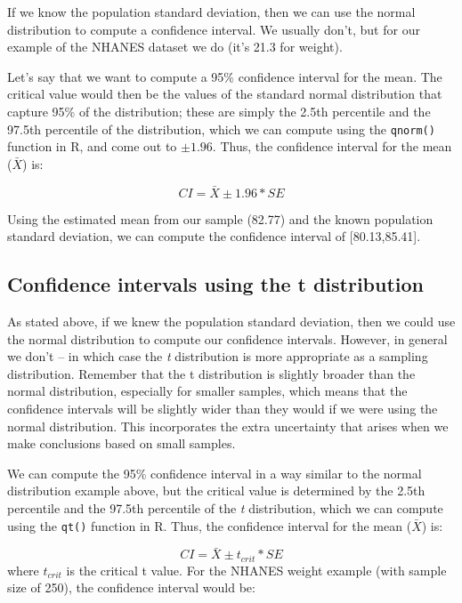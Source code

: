 \documentclass[]{book}
\theoremstyle{definition}
\theoremstyle{definition}
\theoremstyle{definition}
\theoremstyle{remark}
\begin{document}
If we know the population standard deviation, then we can use the normal
distribution to compute a confidence interval. We usually don't, but for
our example of the NHANES dataset we do (it's 21.3 for weight).

Let's say that we want to compute a 95\% confidence interval for the
mean. The critical value would then be the values of the standard normal
distribution that capture 95\% of the distribution; these are simply the
2.5th percentile and the 97.5th percentile of the distribution, which we
can compute using the \texttt{qnorm()} function in R, and come out to
\(\pm 1.96\). Thus, the confidence interval for the mean (\(\bar{X}\))
is:

\[
CI = \bar{X} \pm 1.96*SE
\]

Using the estimated mean from our sample (82.77) and the known
population standard deviation, we can compute the confidence interval of
{[}80.13,85.41{]}.

\subsection{Confidence intervals using the t
distribution}\label{confidence-intervals-using-the-t-distribution}

As stated above, if we knew the population standard deviation, then we
could use the normal distribution to compute our confidence intervals.
However, in general we don't -- in which case the \emph{t} distribution
is more appropriate as a sampling distribution. Remember that the t
distribution is slightly broader than the normal distribution,
especially for smaller samples, which means that the confidence
intervals will be slightly wider than they would if we were using the
normal distribution. This incorporates the extra uncertainty that arises
when we make conclusions based on small samples.

We can compute the 95\% confidence interval in a way similar to the
normal distribution example above, but the critical value is determined
by the 2.5th percentile and the 97.5th percentile of the \emph{t}
distribution, which we can compute using the \texttt{qt()} function in
R. Thus, the confidence interval for the mean (\(\bar{X}\)) is:

\[
CI = \bar{X} \pm t_{crit}*SE
\] where \(t_{crit}\) is the critical t value. For the NHANES weight
example (with sample size of 250), the confidence interval would be:
\end{document}
